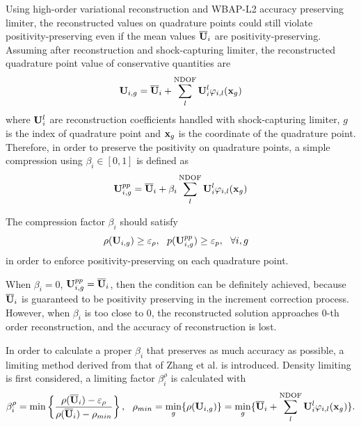 \label{ssec:rec-pp-limiter}

Using high-order variational reconstruction and WBAP-L2
accuracy preserving limiter, the reconstructed values
on quadrature points could still violate positivity-preserving
even if the mean values $\overline{\mathbf{U}}_i$ are positivity-preserving.
Assuming after reconstruction and shock-capturing limiter,
the reconstructed quadrature point value of conservative quantities are
\begin{equation}
    \mathbf{U}_{i,g} = \overline{\mathbf{U}}_{i} + \sum_{l}^{\mathrm{NDOF}}{\mathbf{U}_i^l\varphi_{i,l}(\mathbf{x}_g)}
\end{equation}
where $\mathbf{U}_i^l$ are reconstruction coefficients
handled with shock-capturing limiter,
$g$ is the index of quadrature point and $\mathbf{x}_g$ is the coordinate of
the quadrature point.
Therefore, in order to preserve the positivity on
quadrature points, a simple compression using $\beta_i\in[0,1]$ is defined as 
\begin{equation}
    \mathbf{U}_{i,g}^{pp} = \overline{\mathbf{U}}_{i} + \beta_i \sum_{l}^{\mathrm{NDOF}}{\mathbf{U}_i^l\varphi_{i,l}(\mathbf{x}_g)}
\end{equation}

The compression factor $\beta_i$ should satisfy
\begin{equation}
    \begin{aligned}
        \rho(\mathbf{U}_{i,g}) & \geq \varepsilon_\rho,\ \ p(\mathbf{U}_{i,g}^{pp}) \geq \varepsilon_p ,\ \ \forall i,g
    \end{aligned}
    \label{eq:pointwisePP}
\end{equation}
in order to enforce positivity-preserving on each quadrature point.

When $\beta_i = 0$, $\mathbf{U}_{i,g}^{pp} = \overline{\mathbf{U}}_{i}$, 
then the condition  can be definitely achieved,
because $\overline{\mathbf{U}}_{i}$ is guaranteed to be positivity preserving in the increment correction process.
However, when $\beta_i$ is too close to 0, the reconstructed solution
approaches 0-th order reconstruction, and the accuracy of reconstruction is lost.

In order to calculate a proper $\beta_i$ that preserves as much accuracy as possible, 
a limiting method derived from
that of Zhang et al. \cite{zhang2010positivity}
is introduced.
Density limiting is first considered, 
a limiting factor $\beta_{i}^\rho$ is calculated with
\begin{equation}
    \beta_{i}^\rho = \min\left\{\frac{\rho(\uu_{i}) - \varepsilon_\rho}{\rho(\uu_{i}) - \rho_{min}} \right\},\ \ 
    \rho_{min} = \min_{g}\{\rho(\U_{i,g})\} = 
    \min_{g}\{\uu_{i} + \sum_{l}^{\mathrm{NDOF}}{\U_i^l\varphi_{i,l}(\x_g)}\}.
\end{equation}

